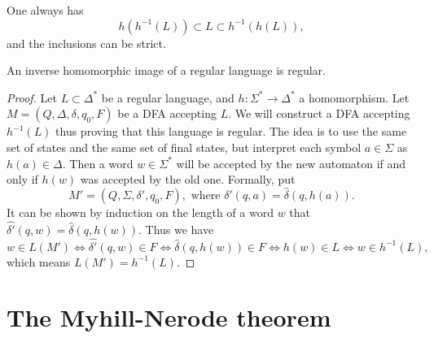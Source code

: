\begin{page}
\setcounter{section}{3}
\setcounter{subsection}{4}
\setcounter{dfn}{16}
\label{portion:1165}


One always has
\[
h(h^{-1}(L)) \subset L \subset h^{-1}(h(L)),
\]
and the inclusions can be strict.


\end{page}

\begin{page}
\setcounter{section}{3}
\setcounter{subsection}{4}
\setcounter{dfn}{17}
\label{portion:1167}

\begin{thm}
An inverse homomorphic image of a regular language is regular.
\end{thm}

\end{page}

\begin{page}
\setcounter{section}{4}
\setcounter{subsection}{0}
\setcounter{dfn}{17}
\label{portion:1168}

\begin{proof}
Let $L \subset \Delta^*$ be a regular language, and $h \colon \Sigma^* \to \Delta^*$ a homomorphism.
Let $M = (Q, \Delta, \delta, q_0, F)$ be a DFA accepting $L$.
We will construct a DFA accepting $h^{-1}(L)$ thus proving that this language is regular.
The idea is to use the same set of states and the same set of final states, but interpret each symbol $a \in \Sigma$ as $h(a) \in \Delta$.
Then a word $w \in \Sigma^*$ will be accepted by the new automaton if and only if $h(w)$ was accepted by the old one.
Formally, put
\[
M' = (Q, \Sigma, \delta', q_0, F), \text{ where }\delta'(q, a) = \widehat{\delta}(q, h(a)).
\]
It can be shown by induction on the length of a word $w$ that $\widehat{\delta'}(q, w) = \widehat{\delta}(q, h(w))$.
Thus we have
\[
w \in L(M') \Leftrightarrow \widehat{\delta'}(q, w) \in F \Leftrightarrow \widehat{\delta}(q, h(w)) \in F \Leftrightarrow h(w) \in L
\Leftrightarrow w \in h^{-1}(L),
\]
which means $L(M') = h^{-1}(L)$.
\end{proof}






\end{page}

\begin{page}
\setcounter{section}{4}
\setcounter{subsection}{1}
\setcounter{dfn}{0}
\label{portion:1170}

\section{The Myhill-Nerode theorem}

\end{page}


